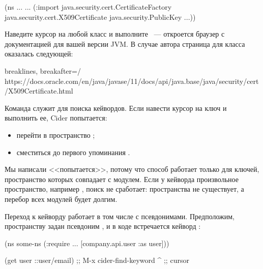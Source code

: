 \begin{english}
  \begin{clojure}
(ns ...
  ...
  (:import
   java.security.cert.CertificateFactory
   java.security.cert.X509Certificate
   java.security.PublicKey
   ...))
  \end{clojure}
\end{english}

Наведите курсор на любой класс и выполните ~--- откроется браузер с документацией для вашей версии JVM. В случае автора страница для класса  оказалась следующей:

\begin{english}
  \begin{text*}{breaklines, breakafter=/}
https://docs.oracle.com/en/java/javase/11/docs/api/java.base/java/security/cert/X509Certificate.html
  \end{text*}
\end{english}

Команда  служит для поиска кейвордов. Если навести курсор на ключ  и выполнить ее, Cider попытается:

\begin{itemize}

\item
  перейти в пространство ;

\item
  сместиться до первого упоминания .

\end{itemize}

Мы написали <<попытается>>, потому что способ работает только для ключей, пространство которых совпадает с модулем. Если у кейворда произвольное пространство, например , поиск не сработает: пространства  не существует, а перебор всех модулей будет долгим.

Переход к кейворду работает в том числе с псевдонимами. Предположим, пространству  задан псевдоним , и в коде встречается кейворд :

\begin{english}
  \begin{clojure}
(ns some-ns
  (:require
   ...
   [company.api.user :as user]))

(get user ::user/email) ;; M-x cider-find-keyword
                ^       ;; cursor
  \end{clojure}
\end{english}

